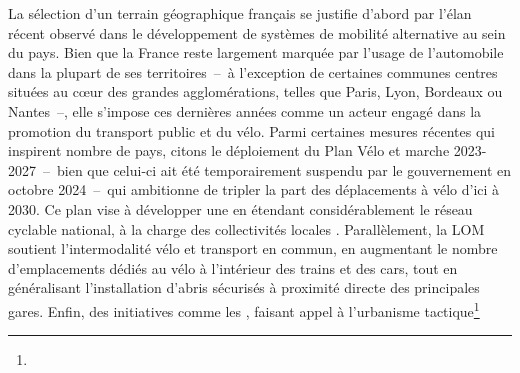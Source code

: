 \begin{refsegment}
La sélection d'un terrain géographique français se justifie d'abord par l'élan récent observé dans le développement de systèmes de mobilité alternative au sein du pays. Bien que la France reste largement marquée par l'usage de l'automobile dans la plupart de ses territoires~–~à l'exception de certaines communes centres situées au cœur des grandes agglomérations, telles que Paris, Lyon, Bordeaux ou Nantes~–, elle s'impose ces dernières années comme un acteur engagé dans la promotion du transport public et du vélo. Parmi certaines mesures récentes qui inspirent nombre de pays, citons le déploiement du Plan Vélo et marche 2023-2027~–~bien que celui-ci ait été temporairement suspendu par le gouvernement en octobre 2024~–~qui ambitionne de tripler la part des déplacements à vélo d'ici à 2030. Ce plan vise à développer une  en étendant considérablement le réseau cyclable national, à la charge des collectivités locales \textcolor{blue}{\autocite{ministere_de_la_transition_ecologique_et_de_la_cohesion_des_territoires_velo_2023}}. Parallèlement, la \acrfull{LOM} soutient l'intermodalité vélo et transport en commun, en augmentant le nombre d'emplacements dédiés au vélo à l'intérieur des trains et des cars, tout en généralisant l'installation d'abris sécurisés à proximité directe des principales gares. Enfin, des initiatives comme les , faisant appel à l'\gls{urbanisme tactique}\footnote{
}
\end{refsegment}
